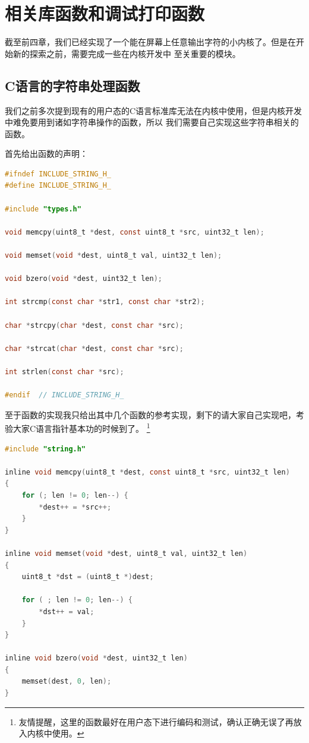 
\section {相关库函数和调试打印函数}

\par 截至前四章，我们已经实现了一个能在屏幕上任意输出字符的小内核了。但是在开始新的探索之前，需要完成一些在内核开发中\allowbreak
至关重要的模块。

\subsection {C语言的字符串处理函数}

\par 我们之前多次提到现有的用户态的C语言标准库无法在内核中使用，但是内核开发中难免要用到诸如字符串操作的函数，所以\allowbreak
我们需要自己实现这些字符串相关的函数。

\par 首先给出函数的声明：

\begin{lstlisting}[language = C, caption = include/string.h]
#ifndef INCLUDE_STRING_H_
#define INCLUDE_STRING_H_

#include "types.h"

void memcpy(uint8_t *dest, const uint8_t *src, uint32_t len);

void memset(void *dest, uint8_t val, uint32_t len);

void bzero(void *dest, uint32_t len);

int strcmp(const char *str1, const char *str2);

char *strcpy(char *dest, const char *src);

char *strcat(char *dest, const char *src);

int strlen(const char *src);

#endif 	// INCLUDE_STRING_H_
\end{lstlisting}

\par 至于函数的实现我只给出其中几个函数的参考实现，剩下的请大家自己实现吧，考验大家C语言指针基本功的时候到了。\allowbreak
\footnote{友情提醒，这里的函数最好在用户态下进行编码和测试，确认正确无误了再放入内核中使用。}

\begin{lstlisting}[language = C, caption = libs/string.c]
#include "string.h"

inline void memcpy(uint8_t *dest, const uint8_t *src, uint32_t len)
{
	for (; len != 0; len--) {
		*dest++ = *src++;
	}
}

inline void memset(void *dest, uint8_t val, uint32_t len)
{
	uint8_t *dst = (uint8_t *)dest;

	for ( ; len != 0; len--) {
		*dst++ = val;
	}
}

inline void bzero(void *dest, uint32_t len)
{
	memset(dest, 0, len);
}
\end{lstlisting}

